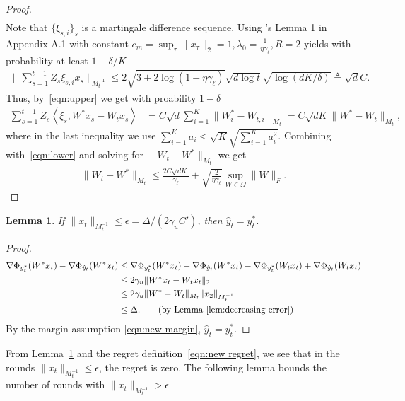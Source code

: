 \documentclass{article}
\newcommand{\nb}{\nabla}
\newcommand{\inner}[1]{ \left\langle {#1} \right\rangle }
\newtheorem{lemma}[theorem]{Lemma}
\begin{document}
\begin{proof}
\begin{align}
\end{align}
Note that $\{\xi_{s,i}\}_{s}$ is a martingale difference sequence. Using \cite{filippi2010parametric}'s Lemma 1 in Appendix A.1 with constant $c_m = \sup_\tau\|x_\tau\|_2=1, \lambda_0 = \frac{1}{\eta\gamma_\ell}, R=2$ yields with probability at least $1-\delta/K$
\begin{align*}
    \Bigg\| \sum_{s=1}^{t-1} Z_s\xi_{s,i}x_s \Bigg\|_{M_t^{-1}} \leq 2\sqrt{3+2\log(1+\eta\gamma_\ell)}\sqrt{d\log t}\sqrt{\log(dK/\delta)} \triangleq \sqrt{d}C.
\end{align*}
Thus, by~\eqref{eqn:upper} we get with proability $1-\delta$
\begin{align*}
    \sum_{s=1}^{t-1} Z_s\inner{\xi_s, W^*x_s-W_tx_s} &= C\sqrt{d}\sum_{i=1}^K \|W^*_i-W_{t,i}\|_{M_t} = C\sqrt{dK} \|W^*-W_{t}\|_{M_t}, 
\end{align*}
where in the last inequality we use $\sum_{i=1}^K a_i\leq \sqrt{K}\sqrt{\sum_{i=1}^K a_i^2}$. Combining with~\eqref{eqn:lower} and solving for $\|W_t-W^*\|_{M_t}$ we get 
\begin{align*}
    \|W_t-W^*\|_{M_t} \leq \frac{2C\sqrt{dK}}{\gamma_\ell} + \sqrt{\frac{2}{\eta \gamma_\ell}}\sup_{W\in \Omega}\|W\|_F. 
\end{align*}

\end{proof}



\begin{lemma}
\label{lem: xbounded}
If $\|x_t\|_{M_t^{-1}}\leq \epsilon = \Delta/(2\gamma_u C')$, then $\hat{y}_t=y^*_t$. 
\end{lemma}
\begin{proof}
\begin{align*}
\nb \Phi_{y_t^*}(W^*x_t) - \nb\Phi_{\hat{y}_t}(W^*x_t) 
 &\leq \nb \Phi_{y_t^*}(W^*x_t) -    \nb\Phi_{\hat{y}_t}(W^*x_t) 
 - \nb \Phi_{y_t^*}(W_tx_t) + \nb \Phi_{\hat{y}_t}(W_tx_t) \\
 & \leq 2\gamma_u \|W^*x_t-W_tx_t\|_2 \\
 & \leq 2\gamma_u \|W^*-W_t\|_{M_t}\|x_2\|_{M_t^{-1}} \\
 & \leq \Delta. \tag{by Lemma~\ref{lem:decreasing error}}
\end{align*}
By the margin assumption \eqref{eqn:new margin}, $\hat{y}_t = y_t^*$. 
\end{proof}

From Lemma~\ref{lem: xbounded} and the regret definition~\eqref{eqn:new regret}, we see that in the rounds $\|x_t\|_{M_t^{-1}}\leq \epsilon$, the regret is zero. The following lemma bounds the number of rounds with $\|x_t\|_{M_t^{-1}} > \epsilon $
\end{document}
